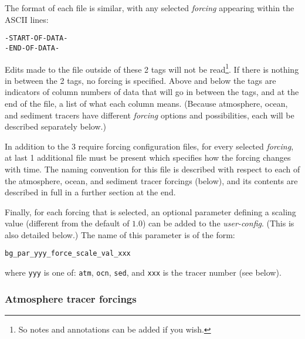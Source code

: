 The format of each file is similar, with any selected \textit{forcing} appearing within the ASCII lines:

\vspace{-2mm}\small\begin{verbatim}
-START-OF-DATA-
-END-OF-DATA-
\end{verbatim}\normalsize\vspace{-2mm}

Edits made to the file outside of these 2 tags will not be read\footnote{So notes and annotations can be added if you wish.}. If there is nothing in between the 2 tags, no forcing is specified. Above and below the tags are indicators of column numbers of data that will go in between the tags, and at the end of the file, a list of what each column means. (Because atmosphere, ocean, and sediment tracers have different \textit{forcing} options and possibilities, each will be described separately below.) 

\vspace{1mm}
In addition to the 3 require forcing configuration files, for every selected \textit{forcing}, at last 1 additional file must be present which specifies how the forcing changes with time. The naming convention for this file is described with respect to each of the atmosphere, ocean, and sediment tracer forcings (below), and its contents are described in full in a further section at the end.

\vspace{1mm}
Finally, for each forcing that is selected, an optional parameter defining a scaling value (different from the default of \(1.0\))  can be added to the \textit{user-config}. (This is also detailed below.) The name of this parameter is of the form:

\vspace{-2mm}\small\begin{verbatim}
bg_par_yyy_force_scale_val_xxx
\end{verbatim}\normalsize\vspace{-2mm}

where \texttt{yyy} is one of: \texttt{atm}, \texttt{ocn}, \texttt{sed}, and \texttt{xxx} is the tracer number (see below).

\newpage

\subsubsection*{Atmosphere tracer forcings}

